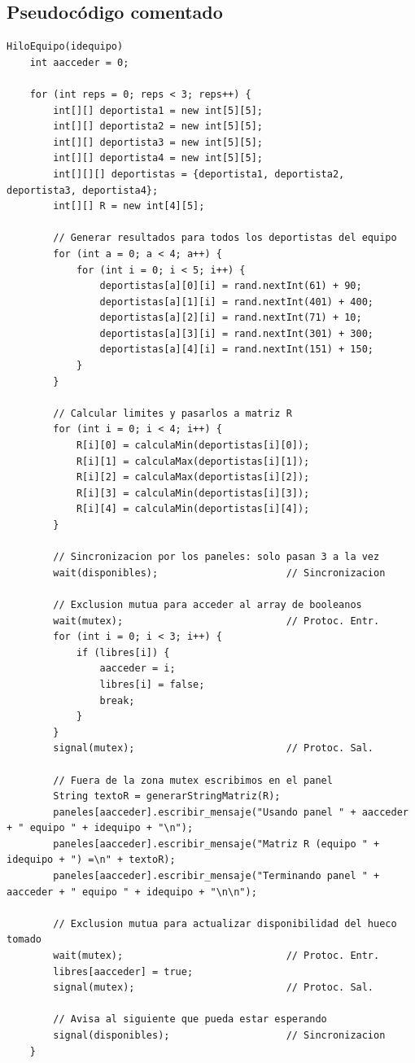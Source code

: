 \documentclass[12pt,a4paper]{article}
\begin{document}
\subsection{Pseudocódigo comentado}

\begin{lstlisting}[language={}, caption={Pseudocódigo HiloEquipo}]
HiloEquipo(idequipo)
    int aacceder = 0;

    for (int reps = 0; reps < 3; reps++) {
        int[][] deportista1 = new int[5][5];
        int[][] deportista2 = new int[5][5];
        int[][] deportista3 = new int[5][5];
        int[][] deportista4 = new int[5][5];
        int[][][] deportistas = {deportista1, deportista2, deportista3, deportista4};
        int[][] R = new int[4][5];

        // Generar resultados para todos los deportistas del equipo
        for (int a = 0; a < 4; a++) {
            for (int i = 0; i < 5; i++) {
                deportistas[a][0][i] = rand.nextInt(61) + 90;
                deportistas[a][1][i] = rand.nextInt(401) + 400;
                deportistas[a][2][i] = rand.nextInt(71) + 10;
                deportistas[a][3][i] = rand.nextInt(301) + 300;
                deportistas[a][4][i] = rand.nextInt(151) + 150;
            }
        }

        // Calcular limites y pasarlos a matriz R
        for (int i = 0; i < 4; i++) {
            R[i][0] = calculaMin(deportistas[i][0]);
            R[i][1] = calculaMax(deportistas[i][1]);
            R[i][2] = calculaMax(deportistas[i][2]);
            R[i][3] = calculaMin(deportistas[i][3]);
            R[i][4] = calculaMin(deportistas[i][4]);
        }

        // Sincronizacion por los paneles: solo pasan 3 a la vez
        wait(disponibles);                      // Sincronizacion

        // Exclusion mutua para acceder al array de booleanos
        wait(mutex);                            // Protoc. Entr.
        for (int i = 0; i < 3; i++) {
            if (libres[i]) {
                aacceder = i;
                libres[i] = false;
                break;
            }
        }
        signal(mutex);                          // Protoc. Sal.

        // Fuera de la zona mutex escribimos en el panel
        String textoR = generarStringMatriz(R);
        paneles[aacceder].escribir_mensaje("Usando panel " + aacceder + " equipo " + idequipo + "\n");
        paneles[aacceder].escribir_mensaje("Matriz R (equipo " + idequipo + ") =\n" + textoR);
        paneles[aacceder].escribir_mensaje("Terminando panel " + aacceder + " equipo " + idequipo + "\n\n");

        // Exclusion mutua para actualizar disponibilidad del hueco tomado
        wait(mutex);                            // Protoc. Entr.
        libres[aacceder] = true;
        signal(mutex);                          // Protoc. Sal.

        // Avisa al siguiente que pueda estar esperando
        signal(disponibles);                    // Sincronizacion
    }
\end{lstlisting}
\end{document}
